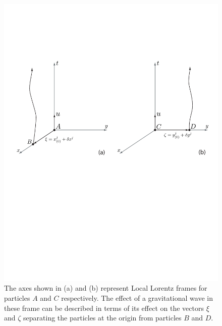 \newpage

\begin{figure}[p]
\label{f:particles}
\begin{center}
\includegraphics[width=\linewidth]{figures/inspiral/deviation}
\end{center}
\caption[Effect of a Gravitational Wave on Test Particles]{%
The axes shown in (a) and (b) represent Local Lorentz frames for particles $A$
and $C$ respectively. The effect of a gravitational wave in these frame can be
described in terms of its effect on the vectors $\xi$ and $\zeta$ separating
the particles at the origin from particles $B$ and $D$.
}
\end{figure}

